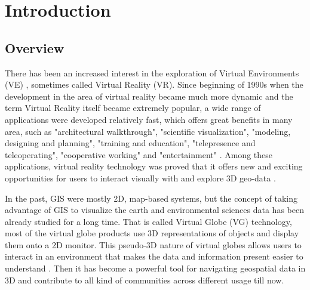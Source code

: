 \label{chapter-introduction}
\chapter{Introduction}

\section{Overview}

There has been an increased interest in the exploration of Virtual Environments (VE) \cite{huang.java-cgi-vr.2002}, sometimes called Virtual Reality (VR). Since beginning of 1990s when the development in the area of virtual reality became much more dynamic and the term Virtual Reality itself became extremely popular, a wide range of applications were developed relatively fast, which offers great benefits in many area, such as "architectural walkthrough", "scientific visualization", "modeling, designing and planning", "training and education", "telepresence and teleoperating", "cooperative working" and "entertainment" \cite{mazuryk.vr.1996}. Among these applications, virtual reality technology was proved that it offers new and exciting opportunities for users to interact visually with and explore 3D geo-data \cite{huang.java-cgi-vr.2002}.

In the past, GIS were mostly 2D, map-based systems, but the concept of taking advantage of GIS to visualize the earth and environmental sciences data has been already studied for a long time. That is called Virtual Globe (VG) technology, most of the virtual globe products use 3D representations of objects and display them onto a 2D monitor. This pseudo-3D nature of virtual globes allows users to interact in an environment that makes the data and information present easier to understand \cite{tuttle.virtual-globes.2008}. Then it has become a powerful tool for navigating geospatial data in 3D and contribute to all kind of communities across different usage till now. 


